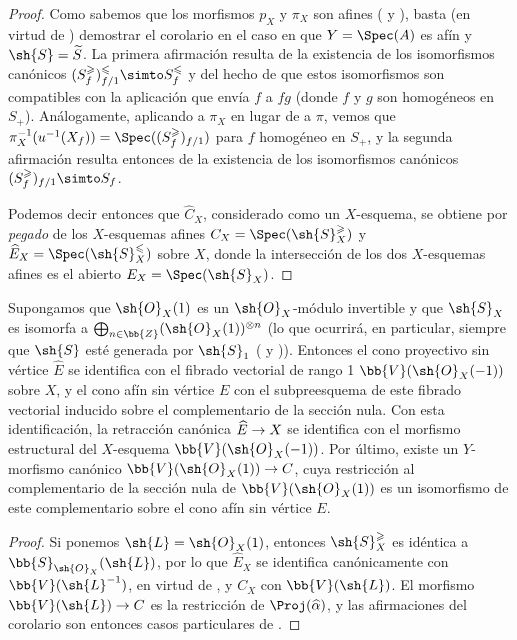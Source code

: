 \documentclass[oneside,10pt]{amsart}
\makeatletter
\renewcommand{\leq}{\leqslant}
\renewcommand{\geq}{\geqslant}
\newcommand{\ega@arrow}[2]{\mathchoice{#1}{#2}{#2}{#2}}
\renewcommand{\to}{\ega@arrow{\longrightarrow}{\rightarrow}}
\let\EGAOriginalLabel\label
\renewcommand{\label}[1]{\phantomsection\EGAOriginalLabel{#1}}
\makeatother
\begin{document}
\begin{proof}
Como sabemos que los morfismos $p_X$ y $\pi_X$ son afines ( y ), basta (en virtud de ) demostrar el corolario en el caso en que $Y=\Spec(A)$ es afín y $\sh{S}=\widetilde{S}$.
La primera afirmación resulta de la existencia de los isomorfismos canónicos  $(S_f^\geq)_{f/1}^\leq \simto S_f^\leq$ y del hecho de que estos isomorfismos son compatibles con la aplicación que envía $f$ a $fg$ (donde $f$ y $g$ son homogéneos en $S_+$).
Análogamente, aplicando  a $\pi_X$ en lugar de a $\pi$, vemos que $\pi_X^{-1}(u^{-1}(X_f)) = \Spec((S_f^\geq)_{f/1})$ para $f$ homogéneo en $S_+$, y la segunda afirmación resulta entonces de la existencia de los isomorfismos canónicos  $(S_f^\geq)_{f/1} \simto S_f$.

Podemos decir entonces que $\widehat{C}_X$, considerado como un $X$-esquema, se obtiene por \emph{pegado} de los $X$-esquemas afines $C_X=\Spec(\sh{S}_X^\geq)$ y $\widehat{E}_X=\Spec(\sh{S}_X^\leq)$ sobre $X$, donde la intersección de los dos $X$-esquemas afines es el abierto $E_X=\Spec(\sh{S}_X)$.
\end{proof}
\begin{corollary}[8.6.4]
\label{II.8.6.4}
Supongamos que $\sh{O}_X(1)$ es un $\sh{O}_X$-módulo invertible y que $\sh{S}_X$ es isomorfa a $\bigoplus_{n\in\bb{Z}}(\sh{O}_X(1))^{\otimes n}$ (lo que ocurrirá, en particular, siempre que $\sh{S}$ esté generada por $\sh{S}_1$ \textup{(} y \textup{))}.
Entonces el cono proyectivo sin vértice $\widehat{E}$ se identifica con el fibrado vectorial de rango 1 $\bb{V}(\sh{O}_X(-1))$ sobre $X$, y el cono afín sin vértice $E$ con el subpreesquema de este fibrado vectorial inducido sobre el complementario de la sección nula.
Con esta identificación, la retracción canónica $\widehat{E}\to X$ se identifica con el morfismo estructural del $X$-esquema $\bb{V}(\sh{O}_X(-1))$.
Por último, existe un $Y$-morfismo canónico $\bb{V}(\sh{O}_X(1))\to C$, cuya restricción al complementario de la sección nula de $\bb{V}(\sh{O}_X(1))$ es un isomorfismo de este complementario sobre el cono afín sin vértice $E$.
\end{corollary}

\begin{proof}
Si ponemos $\sh{L}=\sh{O}_X(1)$, entonces $\sh{S}_X^\geq$ es idéntica a $\bb{S}_{\sh{O}_X}(\sh{L})$, por lo que $\widehat{E}_X$ se identifica canónicamente con $\bb{V}(\sh{L}^{-1})$, en virtud de , y $C_X$ con $\bb{V}(\sh{L})$.
El morfismo $\bb{V}(\sh{L})\to C$ es la restricción de $\Proj(\widehat{\alpha})$, y las afirmaciones del corolario son entonces casos particulares de .
\end{proof}
\end{document}
